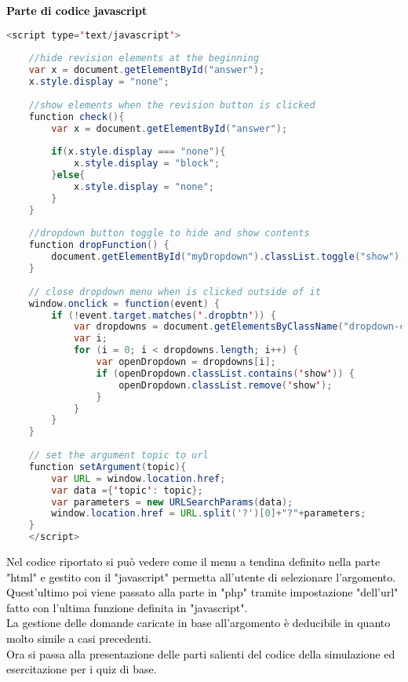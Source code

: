 \textcolor{black}{\textbf{Parte di codice javascript}}\\

\begin{lstlisting}[language=java]
	<script type='text/javascript'>
	
	//hide revision elements at the beginning
	var x = document.getElementById("answer");
	x.style.display = "none";
	
	//show elements when the revision button is clicked
	function check(){
		var x = document.getElementById("answer");
		
		if(x.style.display === "none"){
			x.style.display = "block";
		}else{
			x.style.display = "none";
		}	
	}
	
	//dropdown button toggle to hide and show contents
	function dropFunction() {
		document.getElementById("myDropdown").classList.toggle("show");
	}
	
	// close dropdown menu when is clicked outside of it
	window.onclick = function(event) {
		if (!event.target.matches('.dropbtn')) {
			var dropdowns = document.getElementsByClassName("dropdown-content");
			var i;
			for (i = 0; i < dropdowns.length; i++) {
				var openDropdown = dropdowns[i];
				if (openDropdown.classList.contains('show')) {
					openDropdown.classList.remove('show');
				}
			}
		}
	}
	
	// set the argument topic to url
	function setArgument(topic){
		var URL = window.location.href;
		var data ={'topic': topic};
		var parameters = new URLSearchParams(data);
		window.location.href = URL.split('?')[0]+"?"+parameters;
	}
	</script>
\end{lstlisting}

\textcolor{black}{Nel codice riportato si può vedere come il menu a tendina definito nella parte "html" e gestito con il "javascript" permetta all'utente di selezionare l'argomento. Quest'ultimo poi viene passato alla parte in "php" tramite impostazione "dell'url" fatto con l'ultima funzione definita in "javascript".\\
La gestione delle domande caricate in base all'argomento è deducibile in quanto molto simile a casi precedenti.}\\
\bigskip
\textcolor{black}{Ora si passa alla presentazione delle parti salienti del codice della simulazione ed esercitazione per i quiz di base.}\\

